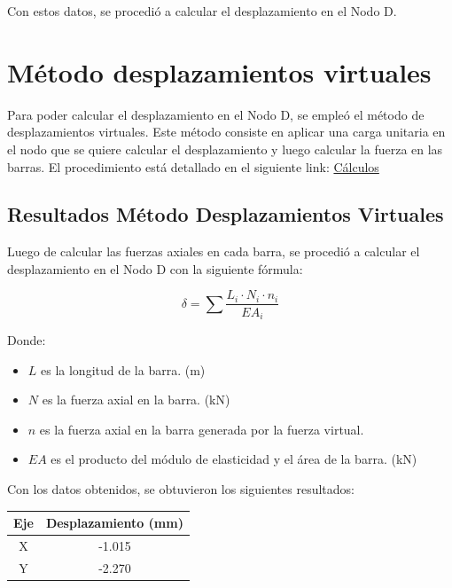 \documentclass{article}  %
\begin{document}
Con estos datos, se procedió a calcular el desplazamiento en el Nodo D.

\newpage
\section{Método desplazamientos virtuales}
Para poder calcular el desplazamiento en el Nodo D, se empleó el método de desplazamientos virtuales. Este método consiste en aplicar una carga unitaria en el nodo que se quiere calcular el desplazamiento y luego calcular la fuerza en las barras. El procedimiento está detallado en el siguiente link: \href{https://github.com/berckanala/P2E0_MCOC/tree/main/Excel}{Cálculos}

\subsection{Resultados Método Desplazamientos Virtuales}

Luego de calcular las fuerzas axiales en cada barra, se procedió a calcular el desplazamiento en el Nodo D con la siguiente fórmula:

\begin{equation}
  \delta = \sum \frac{L_i \cdot N_i \cdot n_i}{EA_i}
  \label{eq:1}
\end{equation}

Donde:
\begin{itemize}
  \item \(L\) es la longitud de la barra. (m)
  \item \(N\) es la fuerza axial en la barra. (kN)
  \item \(n\) es la fuerza axial en la barra generada por la fuerza virtual. 
  \item \(EA\) es el producto del módulo de elasticidad y el área de la barra. (kN)
\end{itemize}

Con los datos obtenidos, se obtuvieron los siguientes resultados:

\begin{table}[h]
  \centering
  
  \begin{tabular}{cc}
    \hline
    \textbf{Eje} & \textbf{Desplazamiento (mm)} \\
    \hline
    X & -1.015 \\
    Y & -2.270 \\
    \hline
  \end{tabular}
\end{table}
\end{document}
